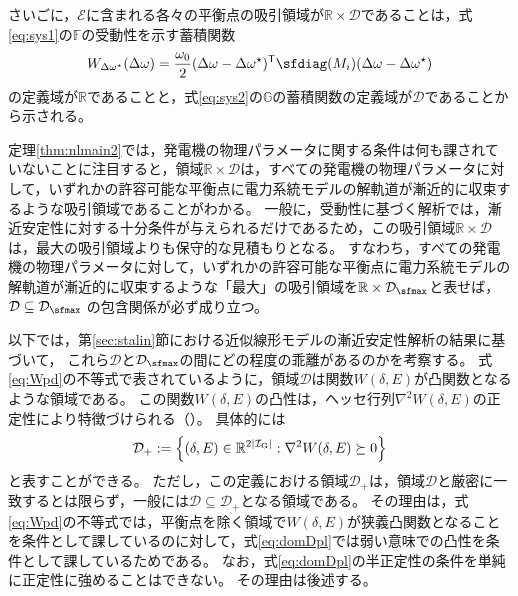 \documentclass[tombow,dvipdfmx]{corona-a5}
\begin{document}
\begin{証明}
さいごに，$\mathcal{E}$に含まれる各々の平衡点の吸引領域が$\mathbb{R}\times \mathcal{D}$であることは，式\ref{eq:sys1}の$\mathds{F}$の受動性を示す蓄積関数
\begin{align*}
W_{\Delta \omega^{\star}}(\Delta \omega)= \frac{\omega_0}{2}
(\Delta \omega -\Delta \omega^{\star})^{\sf T}
\sfdiag(M_i)
(\Delta \omega -\Delta \omega^{\star})
\end{align*}
の定義域が$\mathbb{R}$であることと，式\ref{eq:sys2}の$\mathds{G}$の蓄積関数の定義域が$\mathcal{D}$であることから示される。
\end{証明}

定理\ref{thm:nlmain2}では，発電機の物理パラメータに関する条件は何も課されていないことに注目すると，領域$\mathbb{R}\times \mathcal{D}$は，すべての発電機の物理パラメータに対して，いずれかの許容可能な平衡点に電力系統モデルの解軌道が漸近的に収束するような吸引領域であることがわかる。
一般に，受動性に基づく解析では，漸近安定性に対する十分条件が与えられるだけであるため，この吸引領域$\mathbb{R}\times \mathcal{D}$は，最大の吸引領域よりも保守的な見積もりとなる。
すなわち，すべての発電機の物理パラメータに対して，いずれかの許容可能な平衡点に電力系統モデルの解軌道が漸近的に収束するような「最大」の吸引領域を$\mathbb{R}\times\mathcal{D}_{\sfmax}$と表せば，
$\mathcal{D} \subseteq \mathcal{D}_{\sfmax}$
の包含関係が必ず成り立つ。

以下では，第\ref{sec:stalin}節における近似線形モデルの漸近安定性解析の結果に基づいて，
これら$\mathcal{D}$と$\mathcal{D}_{\sfmax}$の間にどの程度の乖離があるのかを考察する。
式\ref{eq:Wpd}の不等式で表されているように，領域$\mathcal{D}$は関数$W(\delta,E)$が凸関数となるような領域である。
この関数$W(\delta,E)$の凸性は，ヘッセ行列$\nabla^2 W(\delta,E)$の正定性により特徴づけられる（）。
具体的には
\begin{align}\label{eq:domDpl}
\mathcal{D}_{+}:= \left\{
(\delta, E) \in \mathbb{R}^{2 |\mathcal{I}_{\rm G}|}  :
\nabla^2 W(\delta,E) \succeq 0
\right\}
\end{align}
と表すことができる。
ただし，この定義における領域$\mathcal{D}_{+}$は，領域$\mathcal{D}$と厳密に一致するとは限らず，一般には$\mathcal{D} \subseteq \mathcal{D}_{+}$となる領域である。
その理由は，式\ref{eq:Wpd}の不等式では，平衡点を除く領域で$W(\delta,E)$が狭義凸関数となることを条件として課しているのに対して，式\ref{eq:domDpl}では弱い意味での凸性を条件として課しているためである。
なお，式\ref{eq:domDpl}の半正定性の条件を単純に正定性に強めることはできない。
その理由は後述する。
\end{document}
